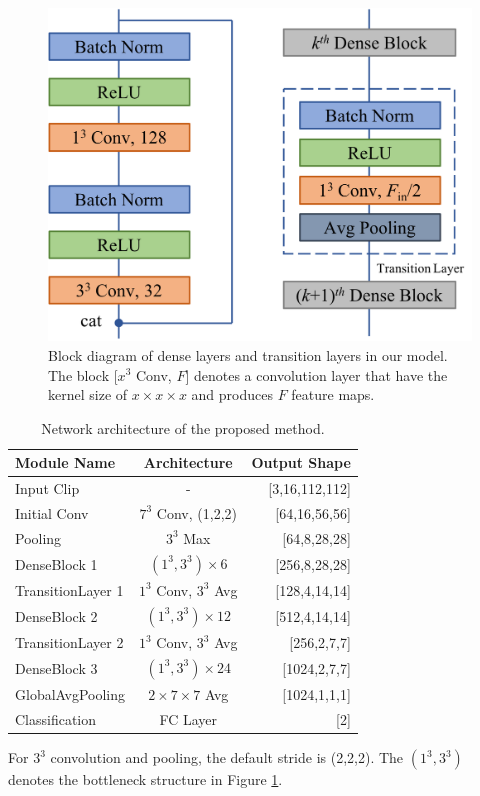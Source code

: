 \documentclass[10pt,twocolumn,letterpaper]{article}
\begin{document}

\begin{figure}[t]
\begin{center}
\includegraphics[scale=0.30]{fig/fig2.png}
\end{center}
\caption{Block diagram of dense layers and transition layers in our model. The block [$x^3$ Conv, $F$] denotes a convolution layer that have the kernel size of $x \times x \times x$ and produces $F$ feature maps.}
\label{fig:bottleneck}
\end{figure}

\begin{table}
\begin{center}
\caption{Network architecture of the proposed method.}
\label{table:arch}
\begin{tabular}{lcr}
\hline
\textbf{Module Name} & \textbf{Architecture} & \textbf{Output Shape} \\
\hline\hline
Input Clip & - & [3,16,112,112] \\
Initial Conv & $7^3$ Conv, (1,2,2) & [64,16,56,56] \\
Pooling & $3^3$ Max & [64,8,28,28] \\
DenseBlock 1 & $(1^3, 3^3) \times 6$ & [256,8,28,28] \\
TransitionLayer 1 & $1^3$ Conv, $3^3$ Avg & [128,4,14,14]\\
DenseBlock 2 & $(1^3, 3^3) \times 12$ & [512,4,14,14] \\
TransitionLayer 2 & $1^3$ Conv, $3^3$ Avg & [256,2,7,7] \\
DenseBlock 3 & $(1^3, 3^3) \times 24$ & [1024,2,7,7]\\
GlobalAvgPooling & $2 \times 7 \times 7$ Avg & [1024,1,1,1]\\
Classification & FC Layer & [2] \\
\hline
\end{tabular}
\end{center}
\footnotesize
For $3^3$ convolution and pooling, the default stride is (2,2,2). The $(1^3, 3^3)$ denotes the bottleneck structure in Figure \ref{fig:bottleneck}.
\end{table}
\end{document}
